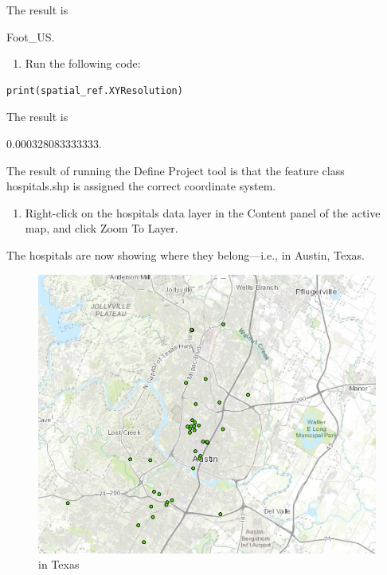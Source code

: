 \documentclass[
]{article}
\providecommand{\tightlist}{%
  \setlength{\itemsep}{0pt}\setlength{\parskip}{0pt}}
\begin{document}
The result is

Foot\_US.

\begin{enumerate}
\def\labelenumi{\arabic{enumi}.}
\setcounter{enumi}{9}
\tightlist
\item
  Run the following code:
\end{enumerate}

\begin{verbatim}
print(spatial_ref.XYResolution)
\end{verbatim}

The result is

0.000328083333333.

The result of running the Define Project tool is that the feature class
hospitals.shp is assigned the correct coordinate system.

\begin{enumerate}
\def\labelenumi{\arabic{enumi}.}
\setcounter{enumi}{10}
\tightlist
\item
  Right-click on the hospitals data layer in the Content panel of the
  active map, and click Zoom To Layer.
\end{enumerate}

The hospitals are now showing where they belong---i.e., in Austin,
Texas.

\begin{figure}
\centering
\includegraphics{../images/lab02_intexas.png}
\caption{in Texas}
\end{figure}
\end{document}
